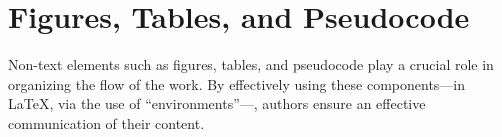 
\chapter{Figures, Tables, and Pseudocode}
\label{ch:nontextelements}

Non-text elements such as figures, tables, and pseudocode play a crucial role in organizing the flow of the work.
By effectively using these components---in \LaTeX{}, via the use of ``environments''---, authors ensure an effective communication of their content.














